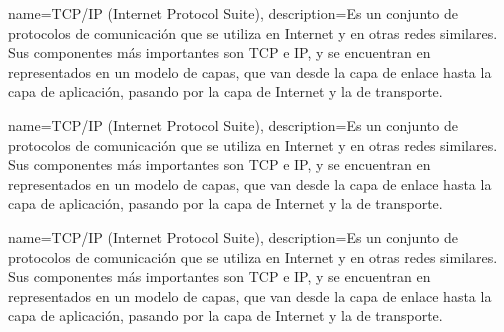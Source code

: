 {name=TCP/IP (Internet Protocol Suite),
 description={Es un conjunto de protocolos de comunicación que se utiliza en Internet y en otras redes similares. Sus componentes más importantes son TCP e IP, y se encuentran en representados en un modelo de capas, que van desde la capa de enlace hasta la capa de aplicación, pasando por la capa de Internet y la de transporte.}
 }
 
{name=TCP/IP (Internet Protocol Suite),
 description={Es un conjunto de protocolos de comunicación que se utiliza en Internet y en otras redes similares. Sus componentes más importantes son TCP e IP, y se encuentran en representados en un modelo de capas, que van desde la capa de enlace hasta la capa de aplicación, pasando por la capa de Internet y la de transporte.}
 }
 
{name=TCP/IP (Internet Protocol Suite),
 description={Es un conjunto de protocolos de comunicación que se utiliza en Internet y en otras redes similares. Sus componentes más importantes son TCP e IP, y se encuentran en representados en un modelo de capas, que van desde la capa de enlace hasta la capa de aplicación, pasando por la capa de Internet y la de transporte.}
 }
 
 
 
